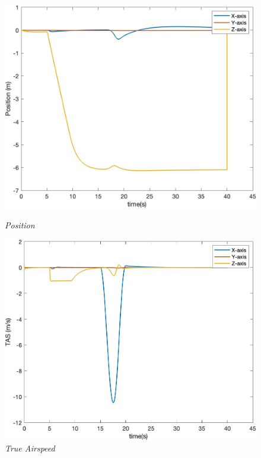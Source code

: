 \begin{figure}[htbp]
  \centering
  \begin{minipage}[b]{0.45\textwidth}
    \centering
    \includegraphics[width=\textwidth]{Images/Gust/VTOL pulse/1 position_2.jpg}
    \caption*{\textit{Position}}
  \end{minipage}
  \hfil
  \begin{minipage}[b]{0.45\textwidth}
    \centering
    \includegraphics[width=\textwidth]{Images/Gust/VTOL pulse/2 airspeed_2.jpg}
    \caption*{\textit{True Airspeed}}
  \end{minipage}
  \begin{minipage}[b]{0.45\textwidth}

\end{minipage}
\end{figure}
